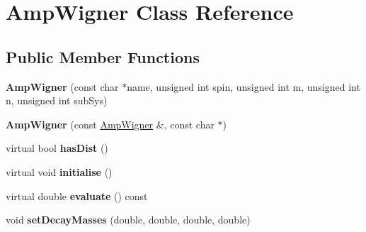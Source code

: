 \hypertarget{class_amp_wigner}{\section{Amp\-Wigner Class Reference}
\label{class_amp_wigner}
}
\subsection*{Public Member Functions}
\begin{DoxyCompactItemize}
\item 
\hypertarget{class_amp_wigner_a69f4e662e997ee0e69e9401ca46ad150}{{\bfseries Amp\-Wigner} (const char $\ast$name, unsigned int spin, unsigned int m, unsigned int n, unsigned int sub\-Sys)}\label{class_amp_wigner_a69f4e662e997ee0e69e9401ca46ad150}

\item 
\hypertarget{class_amp_wigner_a5407f785bfe94046cfbec4009943c628}{{\bfseries Amp\-Wigner} (const \hyperlink{class_amp_wigner}{Amp\-Wigner} \&, const char $\ast$)}\label{class_amp_wigner_a5407f785bfe94046cfbec4009943c628}

\item 
\hypertarget{class_amp_wigner_af46efef6ab12232a04237c92ac2bec89}{virtual bool {\bfseries has\-Dist} ()}\label{class_amp_wigner_af46efef6ab12232a04237c92ac2bec89}

\item 
\hypertarget{class_amp_wigner_aa396cb00c36a480f2656d401f2bc55a6}{virtual void {\bfseries initialise} ()}\label{class_amp_wigner_aa396cb00c36a480f2656d401f2bc55a6}

\item 
\hypertarget{class_amp_wigner_a5ba2441214fa10546f0f4724539c32ad}{virtual double {\bfseries evaluate} () const }\label{class_amp_wigner_a5ba2441214fa10546f0f4724539c32ad}

\item 
\hypertarget{class_amp_wigner_a7631b9cbe704f5ce46c9eaef059813ae}{void {\bfseries set\-Decay\-Masses} (double, double, double, double)}\label{class_amp_wigner_a7631b9cbe704f5ce46c9eaef059813ae}

\end{DoxyCompactItemize}
